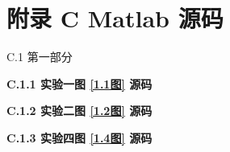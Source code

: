\documentclass[UTF8]{article}
\theoremstyle{MyLineTheoremStyle} %
\theoremstyle{MyBlockTheoremStyle} %
\theoremstyle{MySubsubsectionStyle} %
\begin{document}
\section*{附录 C\hspace*{20pt} Matlab 源码}
\thispagestyle{fancy} 

{\normalfont\Large\bfseries\boldmath 
\begin{center}
    C.1 第一部分
\end{center}
}

{\noindent\normalfont\large\bfseries\boldmath C.1.1 实验一图 \ref{1.1图} 源码}\label{1.1源码}


{\noindent\normalfont\large\bfseries\boldmath C.1.2 实验二图 \ref{1.2图} 源码}\label{1.2源码}


{\noindent\normalfont\large\bfseries\boldmath C.1.3 实验四图 \ref{1.4图} 源码}\label{1.4源码}

\end{document}
